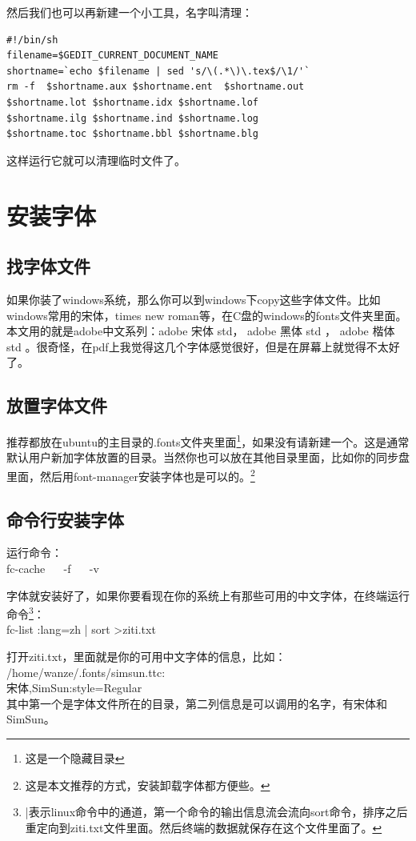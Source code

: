 \documentclass[11pt,oneside]{book}
\begin{document}
然后我们也可以再新建一个小工具，名字叫清理：
\begin{Verbatim}
#!/bin/sh
filename=$GEDIT_CURRENT_DOCUMENT_NAME
shortname=`echo $filename | sed 's/\(.*\)\.tex$/\1/'`
rm -f  $shortname.aux $shortname.ent  $shortname.out 
$shortname.lot $shortname.idx $shortname.lof 
$shortname.ilg $shortname.ind $shortname.log 
$shortname.toc $shortname.bbl $shortname.blg
\end{Verbatim}
这样运行它就可以清理临时文件了。


\section{安装字体}
\label{sec:安装字体} 
\subsection{找字体文件}
如果你装了windows系统，那么你可以到windows下copy这些字体文件。比如windows常用的宋体，times new roman等，在C盘的windows的fonts文件夹里面。本文用的就是adobe中文系列：adobe 宋体 std， adobe 黑体 std ， adobe 楷体 std 。很奇怪，在pdf上我觉得这几个字体感觉很好，但是在屏幕上就觉得不太好了。

\subsection{放置字体文件}
推荐都放在ubuntu的主目录的.fonts文件夹里面\footnote{这是一个隐藏目录}，如果没有请新建一个。这是通常默认用户新加字体放置的目录。当然你也可以放在其他目录里面，比如你的同步盘里面，然后用font-manager安装字体也是可以的。\footnote{这是本文推荐的方式，安装卸载字体都方便些。}

\subsection{命令行安装字体}
运行命令：\\
fc-cache ~~ -f ~~ -v  

字体就安装好了，如果你要看现在你的系统上有那些可用的中文字体，在终端运行命令\footnote{|表示linux命令中的通道，第一个命令的输出信息流会流向sort命令，排序之后重定向到ziti.txt文件里面。然后终端的数据就保存在这个文件里面了。}：\\
fc-list :lang=zh | sort >ziti.txt 

打开ziti.txt，里面就是你的可用中文字体的信息，比如：\\
/home/wanze/.fonts/simsun.ttc: \\宋体,SimSun:style=Regular \\
其中第一个是字体文件所在的目录，第二列信息是可以调用的名字，有宋体和SimSun。
\end{document}
